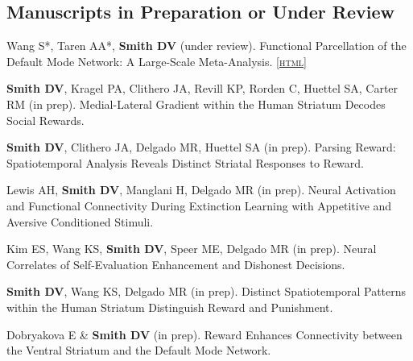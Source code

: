 \documentclass[11pt, letterpaper]{article}
\newcommand{\html}[1]{\href{#1}{\scriptsize\textsc{[html]}}}
\begin{document}
\subsection*{Manuscripts in Preparation or Under Review}

\begin{hangparas}{.5in}{1}

Wang S*, Taren AA*, \textbf{Smith DV} (under review). Functional Parcellation of the Default Mode Network: A Large-Scale Meta-Analysis. \hspace{.2cm} \aibioRxiv \hspace{.1cm} \html{https://www.biorxiv.org/content/early/2017/11/27/225375} 

\textbf{Smith DV}, Kragel PA, Clithero JA, Revill KP, Rorden C, Huettel SA, Carter RM (in prep). Medial-Lateral Gradient within the Human Striatum Decodes Social Rewards.

\textbf{Smith DV}, Clithero JA, Delgado MR, Huettel SA (in prep). Parsing Reward: Spatiotemporal Analysis Reveals Distinct Striatal Responses to Reward.

Lewis AH, \textbf{Smith DV}, Manglani H, Delgado MR (in prep). Neural Activation and Functional Connectivity During Extinction Learning with Appetitive and Aversive Conditioned Stimuli.

Kim ES, Wang KS, \textbf{Smith DV}, Speer ME, Delgado MR (in prep). Neural Correlates of Self-Evaluation Enhancement and Dishonest Decisions.

\textbf{Smith DV}, Wang KS, Delgado MR (in prep). Distinct Spatiotemporal Patterns within the Human Striatum Distinguish Reward and Punishment.

Dobryakova E \& \textbf{Smith DV} (in prep). Reward Enhances Connectivity between the Ventral Striatum and the Default Mode Network.

\end{hangparas}

\end{document}
